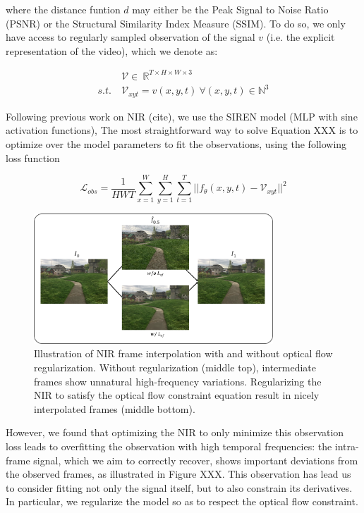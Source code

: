\documentclass{article}
\begin{document}
where the distance funtion $d$ may either be the Peak Signal to Noise Ratio (PSNR) or the Structural Similarity Index Measure (SSIM).
To do so, we only have access to regularly sampled observation of the signal $v$ (i.e. the explicit representation of the video), which we denote as:

\begin{equation}
\begin{aligned}
&\mathcal{V} \in  \: \mathbb{R}^{T \times H \times W \times 3} \\
s.t. \: &\mathcal{V}_{xyt} =   v(x, y, t) \: \forall (x, y, t) \in \mathbb{N}^3
\end{aligned}
\end{equation}

Following previous work on NIR (cite), we use the SIREN model (MLP with sine activation functions),
The most straightforward way to solve Equation XXX is to optimize over the model parameters to fit the observations,
using the following loss function

\begin{equation}
\mathcal{L}_{obs} = \frac{1}{HWT} \sum_{x=1}^W\sum_{y=1}^H\sum_{t=1}^T || f_{\theta}(x,y,t) - \mathcal{V}_{xyt} ||^2
\end{equation}

\begin{figure}[t]
\centering
\includegraphics[width=0.8\textwidth]{"w_wo_OF"}
\caption{Illustration of NIR frame interpolation with and without optical flow regularization. 
Without regularization (middle top), intermediate frames show unnatural high-frequency variations.
Regularizing the NIR to satisfy the optical flow constraint equation result in nicely interpolated frames (middle bottom).
}
\end{figure}

However, we found that optimizing the NIR to only minimize this observation loss leads to overfitting the observation with high temporal frequencies:
the intra-frame signal, which we aim to correctly recover, shows important deviations from the observed frames, as illustrated in Figure XXX.
This observation has lead us to consider fitting not only the signal itself, but to also constrain its derivatives.
In particular, we regularize the model so as to respect the optical flow constraint.
\end{document}
